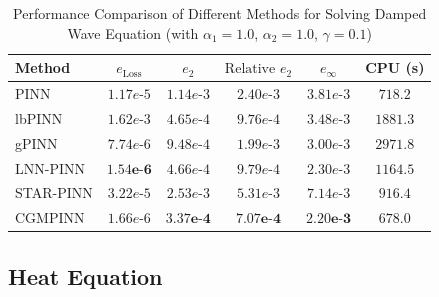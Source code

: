 \documentclass{article}
\theoremstyle{plain}
\theoremstyle{definition}
\theoremstyle{remark}
\begin{document}
\begin{table}[t]
	\centering
	\caption{Performance Comparison of Different Methods for Solving Damped Wave Equation (with $\alpha_1 = 1.0$, $\alpha_2 = 1.0$, $\gamma = 0.1$)}
	\label{tab:1d_damped_wave_pinn_methods_performance}
	\begin{tabular}{lccccc}
		\toprule
		Method & $e_{\text{Loss}}$ & $e_2$ & $\text{Relative } e_2$ & $e_\infty$ & CPU (s) \\
		\midrule
		PINN               & $1.17e\text{-}5$ & $1.14e\text{-}3$ & $2.40e\text{-}3$ & $3.81e\text{-}3$ & $718.2$   \\
		lbPINN             & $1.62e\text{-}3$ & $4.65e\text{-}4$ & $9.76e\text{-}4$ & $3.48e\text{-}3$ & $1881.3$   \\
		gPINN              & $7.74e\text{-}6$ & $9.48e\text{-}4$ & $1.99e\text{-}3$ & $3.00e\text{-}3$ & $2971.8$   \\
		LNN-PINN           & $\mathbf{1.54e\text{-}6}$ & $4.66e\text{-}4$ & $9.79e\text{-}4$ & $2.30e\text{-}3$ & $1164.5$   \\
		STAR-PINN          & $3.22e\text{-}5$ & $2.53e\text{-}3$ & $5.31e\text{-}3$ & $7.14e\text{-}3$ & $916.4$   \\
		CGMPINN            & $1.66e\text{-}6$ & $\mathbf{3.37e\text{-}4}$ & $\mathbf{7.07e\text{-}4}$ & $\mathbf{2.20e\text{-}3}$ & $678.0$   \\
		\bottomrule
	\end{tabular}
\end{table}

\subsection{Heat Equation}
\label{subsec:heat_equation}
\end{document}

